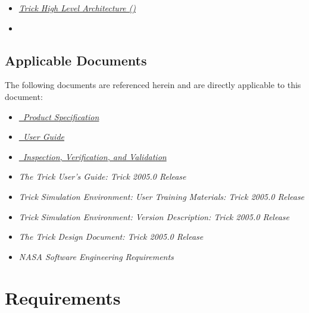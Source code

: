 \documentclass[twoside,11pt,titlepage]{report}
\begin{document}
\begin{itemize}
\item{\href{file:\TRICKHLAHOME/docs/TrickHLA.pdf}
           {\em Trick High Level Architecture (\TrickHLA)}}
\cite{trickhlaenv:TrickHLA}

\item{\href{file:MODEL.pdf}
           {\em \MODEL}}
\cite{trickhlaenv:MODEL}
\end{itemize}

\section{Applicable Documents}
The following documents are referenced herein and are directly
applicable to this document:

\begin{itemize}
\item{\href{file:MODELSpec.pdf}
           {\em \MODEL\ Product Specification}}
\cite{trickhlaenv:MODELSpec}

\item{\href{file:MODELUser.pdf}
           {\em \MODEL\ User Guide}}
\cite{trickhlaenv:MODELUser}

\item{\href{file:MODELIVV.pdf}
           {\em \MODEL\ Inspection, Verification, and Validation}}
\cite{trickhlaenv:MODELIVV}

\item{\em The Trick User's Guide: Trick 2005.0 Release}
\cite{Vetter:TrickUser}

\item{\em Trick Simulation Environment: User Training Materials:
          Trick 2005.0 Release}
\cite{Vetter:TrickUTM}

\item{\em Trick Simulation Environment: Version Description:
          Trick 2005.0 Release}
\cite{Vetter:TrickVD}

\item{\em The Trick Design Document: Trick 2005.0 Release}
\cite{Vetter:TrickDD}

\item{\em NASA Software Engineering Requirements}
\cite{NASA:SWE}

\end{itemize}


\chapter{Requirements}\label{sec:reqts}
\end{document}
